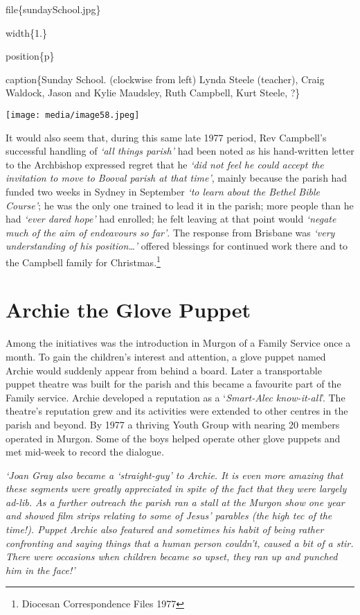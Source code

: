 file\{sundaySchool.jpg\}

width\{1.\}

position\{p\}

caption\{Sunday School. (clockwise from left) Lynda Steele (teacher), Craig Waldock, Jason and Kylie Maudsley, Ruth Campbell, Kurt Steele, ?\}

\texttt{[image: media/image58.jpeg]}

It would also seem that, during this same late 1977 period, Rev Campbell's successful handling of \emph{`all things parish'} had been noted as his hand-written letter to the Archbishop expressed regret that he \emph{`did not feel he could accept the invitation to move to Booval parish at that time'}, mainly because the parish had funded two weeks in Sydney in September \emph{`to learn about the Bethel Bible Course'}; he was the only one trained to lead it in the parish; more people than he had \emph{`ever dared hope'} had enrolled; he felt leaving at that point would \emph{`negate much of the aim of endeavours so far'}. The response from Brisbane was \emph{`very understanding of his position\ldots'} offered blessings for continued work there and to the Campbell family for Christmas.\footnote{Diocesan Correspondence Files 1977}

\hypertarget{archie-the-glove-puppet}{%
\section{Archie the Glove Puppet}\label{archie-the-glove-puppet}}

Among the initiatives was the introduction in Murgon of a Family Service once a month. To gain the children's interest and attention, a glove puppet named Archie would suddenly appear from behind a board. Later a transportable puppet theatre was built for the parish and this became a favourite part of the Family service. Archie developed a reputation as a `\emph{Smart-Alec know-it-all}'. The theatre's reputation grew and its activities were extended to other centres in the parish and beyond. By 1977 a thriving Youth Group with nearing 20 members operated in Murgon. Some of the boys helped operate other glove puppets and met mid-week to record the dialogue\emph{.}

\emph{`Joan Gray also became a `straight-guy' to Archie. It is even more amazing that these segments were greatly appreciated in spite of the fact that they were largely ad-lib. As a further outreach the parish ran a stall at the Murgon show one year and showed film strips relating to some of Jesus' parables (the high tec of the time!). Puppet Archie also featured and sometimes his habit of being rather confronting and saying things that a human person couldn't, caused a bit of a stir. There were occasions when children became so upset, they ran up and punched him in the face!'}

